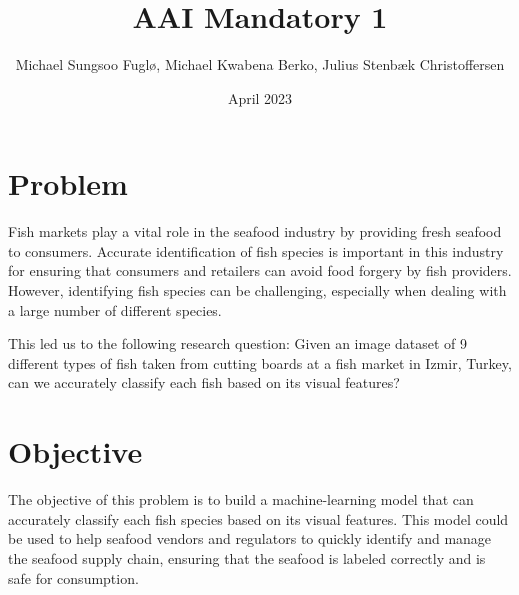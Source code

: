 \documentclass[a4paper, twocolumn]{article}
\author{Michael Sungsoo Fuglø, Michael Kwabena Berko, Julius Stenbæk Christoffersen}
\title{AAI Mandatory 1}
\date{April 2023}
\begin{document}

\section{Problem\label{sec:Problem}}

Fish markets play a vital role in the seafood industry by providing fresh seafood to consumers. Accurate identification of fish species is important in this industry for ensuring that consumers and retailers can avoid food forgery by fish providers. However, identifying fish species can be challenging, especially when dealing with a large number of different species. \cite{10.1371/journal.pone.0012620}

This led us to the following research question:
Given an image dataset of 9 different types of fish taken from cutting boards at a fish market in Izmir, Turkey, can we accurately classify each fish based on its visual features?

\section{Objective\label{sec:Objective}}


The objective of this problem is to build a machine-learning model that can accurately classify each fish species based on its visual features. This model could be used to help seafood vendors and regulators to quickly identify and manage the seafood supply chain, ensuring that the seafood is labeled correctly and is safe for consumption. 
\end{document}
